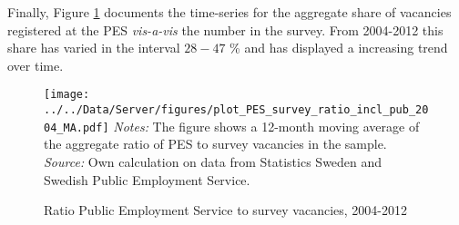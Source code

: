 Finally, Figure \ref{fig:agg_PES_survey_share} documents the time-series for the aggregate share of vacancies registered at the PES \emph{vis-a-vis} the number in the survey. From 2004-2012 this share has varied in the interval $28-47$ \% and has displayed a increasing trend over time.

\begin{figure}[h]
\centering
\caption{Ratio Public Employment Service to survey vacancies, 2004-2012 }
\texttt{[image: ../../Data/Server/figures/plot\_PES\_survey\_ratio\_incl\_pub\_2004\_MA.pdf]}
\flushleft
\footnotesize{\emph{Notes:} The figure shows a 12-month moving average of the aggregate ratio of PES to survey vacancies in the sample.} \\
\footnotesize{\emph{Source:} Own calculation on data from Statistics Sweden and Swedish Public Employment Service.}
\label{fig:agg_PES_survey_share}
\end{figure}